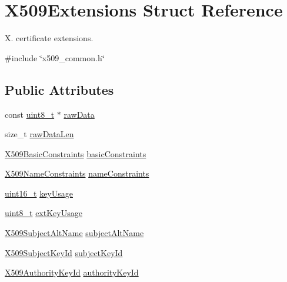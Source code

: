 \hypertarget{structX509Extensions}{}\section{X509\+Extensions Struct Reference}
\label{structX509Extensions}


X. certificate extensions.  




{\ttfamily \#include \char`\"{}x509\+\_\+common.\+h\char`\"{}}

\subsection*{Public Attributes}
\begin{DoxyCompactItemize}
\item 
const \hyperlink{stdint_8h_aba7bc1797add20fe3efdf37ced1182c5}{uint8\+\_\+t} $\ast$ \hyperlink{structX509Extensions_aed67fee9d790d14c3af1381cd07a7e0a}{raw\+Data}
\item 
size\+\_\+t \hyperlink{structX509Extensions_affa35283aa7142110b2973474b7b1965}{raw\+Data\+Len}
\item 
\hyperlink{structX509BasicConstraints}{X509\+Basic\+Constraints} \hyperlink{structX509Extensions_ab06800e3424608f8d652ff23c5a027a9}{basic\+Constraints}
\item 
\hyperlink{structX509NameConstraints}{X509\+Name\+Constraints} \hyperlink{structX509Extensions_a25c09f610754fe740c393867ee9950a9}{name\+Constraints}
\item 
\hyperlink{stdint_8h_a273cf69d639a59973b6019625df33e30}{uint16\+\_\+t} \hyperlink{structX509Extensions_adc23b201b2f81c036bb2f6fb364af346}{key\+Usage}
\item 
\hyperlink{stdint_8h_aba7bc1797add20fe3efdf37ced1182c5}{uint8\+\_\+t} \hyperlink{structX509Extensions_afad9dec97dd6bba0297e67efd46ff042}{ext\+Key\+Usage}
\item 
\hyperlink{structX509SubjectAltName}{X509\+Subject\+Alt\+Name} \hyperlink{structX509Extensions_a6a01ce6bc43517af604b8cf580ebd01d}{subject\+Alt\+Name}
\item 
\hyperlink{structX509SubjectKeyId}{X509\+Subject\+Key\+Id} \hyperlink{structX509Extensions_a720e6ecde7eba80ee36a83d18a67dfd9}{subject\+Key\+Id}
\item 
\hyperlink{structX509AuthorityKeyId}{X509\+Authority\+Key\+Id} \hyperlink{structX509Extensions_acc617db6c54f375abf1455a73e2c5ea3}{authority\+Key\+Id}
\item 

\end{DoxyCompactItemize}
